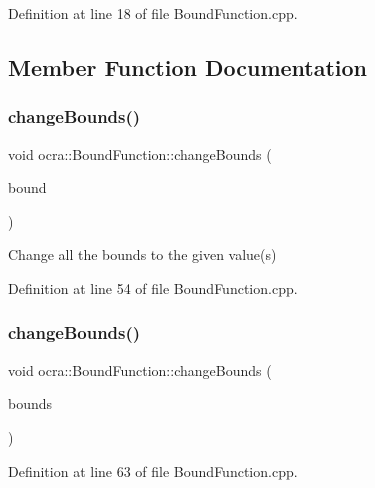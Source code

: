 Definition at line 18 of file Bound\+Function.\+cpp.



\subsection{Member Function Documentation}
\hypertarget{classocra_1_1BoundFunction_a205a73bb12f3255368d125ba0a6b4e58}{}\label{classocra_1_1BoundFunction_a205a73bb12f3255368d125ba0a6b4e58} 
\subsubsection{\texorpdfstring{change\+Bounds()}{changeBounds()}\hspace{0.1cm}{\footnotesize\ttfamily [1/2]}}
{\footnotesize\ttfamily void ocra\+::\+Bound\+Function\+::change\+Bounds (\begin{DoxyParamCaption}\item[{const double}]{bound }\end{DoxyParamCaption})}

Change all the bounds to the given value(s) 

Definition at line 54 of file Bound\+Function.\+cpp.

\hypertarget{classocra_1_1BoundFunction_aa69f4a52a46914e6ecbffb525e7d1314}{}\label{classocra_1_1BoundFunction_aa69f4a52a46914e6ecbffb525e7d1314} 
\subsubsection{\texorpdfstring{change\+Bounds()}{changeBounds()}\hspace{0.1cm}{\footnotesize\ttfamily [2/2]}}
{\footnotesize\ttfamily void ocra\+::\+Bound\+Function\+::change\+Bounds (\begin{DoxyParamCaption}\item[{const Vector\+Xd \&}]{bounds }\end{DoxyParamCaption})}



Definition at line 63 of file Bound\+Function.\+cpp.

\hypertarget{classocra_1_1BoundFunction_ad9a5cb9442e2129111d189e8063304ad}{}\label{classocra_1_1BoundFunction_ad9a5cb9442e2129111d189e8063304ad} 
